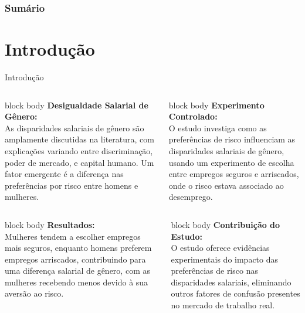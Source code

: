 \documentclass[aspectratio=169, xcolor={dvipsnames}, 10pt, brazil]{beamer}
\begin{document}
\begin{frame}[t]
    \frametitle{Sumário}
    \scriptsize
    \tableofcontents
\end{frame}

\section{Introdução}
\begin{frame}{Introdução}

    \begin{columns}
        \begin{beamercolorbox}[wd=\textwidth,rounded=true,shadow=true]{block body}
            \textbf{Desigualdade Salarial de Gênero:} \\
            As disparidades salariais de gênero são amplamente discutidas na literatura, com explicações variando entre discriminação, poder de mercado, e capital humano. Um fator emergente é a diferença nas preferências por risco entre homens e mulheres.
        \end{beamercolorbox}
        
        \begin{beamercolorbox}[wd=\textwidth,rounded=true,shadow=true]{block body}
            \textbf{Experimento Controlado:} \\
            O estudo investiga como as preferências de risco influenciam as disparidades salariais de gênero, usando um experimento de escolha entre empregos seguros e arriscados, onde o risco estava associado ao desemprego.
        \end{beamercolorbox}
    \end{columns}
    
\vspace*{0.2cm}

    \begin{columns}
        \begin{beamercolorbox}[wd=\textwidth,rounded=true,shadow=true]{block body}
            \textbf{Resultados:} \\
            Mulheres tendem a escolher empregos mais seguros, enquanto homens preferem empregos arriscados, contribuindo para uma diferença salarial de gênero, com as mulheres recebendo menos devido à sua aversão ao risco.
        \end{beamercolorbox}
        
        \begin{beamercolorbox}[wd=\textwidth,rounded=true,shadow=true]{block body}
            \textbf{Contribuição do Estudo:} \\
            O estudo oferece evidências experimentais do impacto das preferências de risco nas disparidades salariais, eliminando outros fatores de confusão presentes no mercado de trabalho real.
        \end{beamercolorbox}
    \end{columns}

\end{frame}
\end{document}
